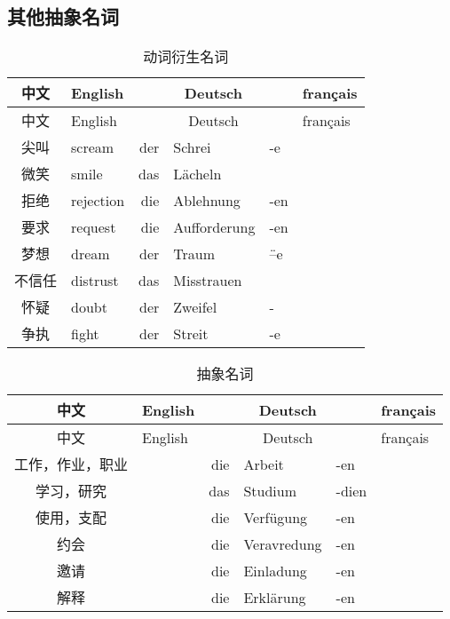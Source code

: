 \documentclass[12pt,A4paper,oneside,reqno]{amsart}
\numberwithin{equation}{section}
\theoremstyle{plain}
\theoremstyle{plain}
\theoremstyle{plain}
\numberwithin{equation}{section}
\theoremstyle{remark}
\begin{document}
\subsection{其他抽象名词}\hspace{1cm}
\begin{longtable}{c|l|rll|l}
	\hline
	中文	&	English	&\multicolumn{3}{c|}{Deutsch} &	français  	\\
	\hline
	\endhead
	\hline
	中文	&	English	&\multicolumn{3}{c|}{Deutsch} &	français  	\\
	\hline
	\endfirsthead	
	\hline
	\endfoot
	\hline	
	\caption{动词衍生名词}
	\endlastfoot				
尖叫	&	scream	&	der	&	Schrei	&	-e	&		\\
微笑	&	smile	&	das	&	Lächeln	&		&		\\
拒绝	&	rejection	&	die	&	Ablehnung	&	-en	&		\\
要求	&	request	&	die	&	Aufforderung	&	-en	&		\\
梦想	&	dream	&	der	&	Traum	&	\"{--}e	&		\\
不信任	&	distrust	&	das	&	Misstrauen	&		&		\\
怀疑	&	doubt	&	der	&	Zweifel	&	-	&		\\
争执	&	fight	&	der	&	Streit	&	-e	&		\\

	
	
\end{longtable}
\begin{longtable}{c|l|rll|l}
	\hline
	中文	&	English	&\multicolumn{3}{c|}{Deutsch} &	français  	\\
	\hline
	\endhead
	\hline
	中文	&	English	&\multicolumn{3}{c|}{Deutsch} &	français  	\\
	\hline
	\endfirsthead	
	\hline
	\endfoot
	\hline	
	\caption{抽象名词}
	\endlastfoot				
工作，作业，职业	&	&	die	&	Arbeit	&	-en	&		\\
学习，研究	&	&	das	&	Studium	&	-dien	&		\\
使用，支配	&	&	die	&	Verf\"{u}gung	&	-en	&		\\
约会	&	&	die	&	Veravredung	&	-en	&		\\
邀请	&	&	die	&	Einladung	&	-en	&		\\
解释	&	&	die	&	Erklärung	&	-en	&		\\
	
	
\end{longtable}
\end{document}
